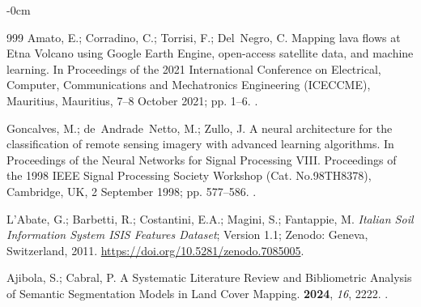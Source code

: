 \documentclass[jimaging,article,accept,pdftex,oneauthor]{Definitions/mdpi}
\begin{document}
\begin{adjustwidth}{-\extralength}{0cm}
\begin{thebibliography}{999}
Amato, E.; Corradino, C.; Torrisi, F.; Del~Negro, C.
\newblock Mapping lava flows at Etna Volcano using Google Earth Engine,
  open-access satellite data, and machine learning.
\newblock In Proceedings of the 2021 International Conference on Electrical,
  Computer, Communications and Mechatronics Engineering (ICECCME),  {Mauritius, Mauritius, 7--8 October} 2021; pp.
  1--6.
.

Goncalves, M.; de~Andrade~Netto, M.; Zullo, J.
\newblock A neural architecture for the classification of remote sensing
  imagery with advanced learning algorithms.
\newblock In Proceedings of the Neural Networks for Signal Processing VIII.
  Proceedings of the 1998 IEEE Signal Processing Society Workshop (Cat.
  No.98TH8378), {Cambridge, UK, 2 September} 1998; pp. 577--586.
.


L’Abate, G.; Barbetti, R.; Costantini, E.A.; Magini, S.; Fantappie, M.
\newblock \emph{Italian Soil Information System ISIS Features Dataset}; Version 1.1; Zenodo: Geneva, Switzerland, 2011. %
\newblock %
 {\url{https://doi.org/10.5281/zenodo.7085005}}.

Ajibola, S.; Cabral, P.
\newblock A Systematic Literature Review and Bibliometric Analysis of Semantic
  Segmentation Models in Land Cover Mapping.
 {\bf 2024}, {\em 16}, {2222}.
.


\end{thebibliography}
\end{adjustwidth}
\end{document}
